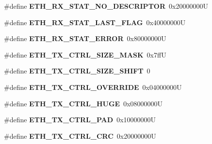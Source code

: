 \begin{DoxyCompactItemize}
\item 
\mbox{\label{lpc-ethernet_8c_a77031a9665a8bb8379411fbcf07a78f4}} 
\#define {\bfseries E\+T\+H\+\_\+\+R\+X\+\_\+\+S\+T\+A\+T\+\_\+\+N\+O\+\_\+\+D\+E\+S\+C\+R\+I\+P\+T\+OR}~0x20000000U
\item 
\mbox{\label{lpc-ethernet_8c_a8dbc0976ca0e4922b3b90761f195d908}} 
\#define {\bfseries E\+T\+H\+\_\+\+R\+X\+\_\+\+S\+T\+A\+T\+\_\+\+L\+A\+S\+T\+\_\+\+F\+L\+AG}~0x40000000U
\item 
\mbox{\label{lpc-ethernet_8c_abb6e16683426b847ba78c7be8d99c526}} 
\#define {\bfseries E\+T\+H\+\_\+\+R\+X\+\_\+\+S\+T\+A\+T\+\_\+\+E\+R\+R\+OR}~0x80000000U
\item 
\mbox{\label{lpc-ethernet_8c_a4d2d799865ce60fe1f2c785ac402618c}} 
\#define {\bfseries E\+T\+H\+\_\+\+T\+X\+\_\+\+C\+T\+R\+L\+\_\+\+S\+I\+Z\+E\+\_\+\+M\+A\+SK}~0x7ffU
\item 
\mbox{\label{lpc-ethernet_8c_a9e42aa06978c56f5a1cea0da12d2786d}} 
\#define {\bfseries E\+T\+H\+\_\+\+T\+X\+\_\+\+C\+T\+R\+L\+\_\+\+S\+I\+Z\+E\+\_\+\+S\+H\+I\+FT}~0
\item 
\mbox{\label{lpc-ethernet_8c_a888c7348b018828c6a4a4a1c7334b8cc}} 
\#define {\bfseries E\+T\+H\+\_\+\+T\+X\+\_\+\+C\+T\+R\+L\+\_\+\+O\+V\+E\+R\+R\+I\+DE}~0x04000000U
\item 
\mbox{\label{lpc-ethernet_8c_a0c9c2c100e280a0ef92dec2c98c6f64e}} 
\#define {\bfseries E\+T\+H\+\_\+\+T\+X\+\_\+\+C\+T\+R\+L\+\_\+\+H\+U\+GE}~0x08000000U
\item 
\mbox{\label{lpc-ethernet_8c_a7c7e8f027e257d29e3c84e773fb27ffc}} 
\#define {\bfseries E\+T\+H\+\_\+\+T\+X\+\_\+\+C\+T\+R\+L\+\_\+\+P\+AD}~0x10000000U
\item 
\mbox{\label{lpc-ethernet_8c_a0be98a723bb9350078db2115a5d70e71}} 
\#define {\bfseries E\+T\+H\+\_\+\+T\+X\+\_\+\+C\+T\+R\+L\+\_\+\+C\+RC}~0x20000000U
\item 
\mbox{\label{lpc-ethernet_8c_a19328c96e0057e3df0eaf63cd0042921}} 

\end{DoxyCompactItemize}
